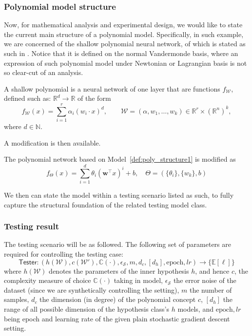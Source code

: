 \subsubsection{Polynomial model structure} 

Now, for mathematical analysis and experimental design, we would like to state the current main structure of a polynomial model. Specifically, in such example, we are concerned of the shallow polynomial neural network, of which is stated as such in \cite{arjevani2025geometryoptimizationshallowpolynomial}. Notice that it is defined on the normal Vandermonde basis, where an expression of such polynomial model under Newtonian or Lagrangian basis is not so clear-cut of an analysis.  

\begin{definition}\label{def:poly_structure1}
    A shallow polynomial is a neural network of one layer that are functions $f_{\mathcal W}$, defined such as:
$\mathbb R^d \rightarrow \mathbb{R}$ of the form
\begin{equation}\label{eq:network_model} f_{\mathcal W}(x) = \sum_{i=1}^r
\alpha_{i} (w_i \cdot x)^d, \qquad \mathcal W = (\alpha,w_1,\ldots,w_k) \in
\mathbb{R}^r \times (\mathbb{R}^{n})^k,
\end{equation} 
where $d \in \mathbb{N}$.
\end{definition}
A modification is then available. 
\begin{definition}
    The polynomial network based on Model~\ref{def:poly_structure1} is modified as 
    \begin{equation}
        f_{\Theta}(x) = \sum_{i=1}^{d} \theta_i \left( \mathbf{w}^\top x \right)^i + b, \quad \Theta = (\{\theta_{i}\},\{w_{k}\},b)
    \end{equation}
\end{definition}
We then can state the model within a testing scenario listed as such, to fully capture the structural foundation of the related testing model class. 

\subsubsection{Testing result}

The testing scenario will be as followed. The following set of parameters are required for controlling the testing case: 
\begin{equation}
    \mathsf{Tester}: (h(\mathcal{W}),c(\mathcal{W}'),\mathbb{C}(\cdot), \epsilon_{\mathcal{S}}, m, d_{c}, [d_{h}], \mathrm{epoch}, lr)\to \{\mathbb{E}[\ell]\}
\end{equation}
where $h(\mathcal{W})$ denotes the parameters of the inner hypothesis $h$, and hence $c$, the complexity measure of choice $\mathbb{C}(\cdot)$ taking in model, $\epsilon_{\mathcal{S}}$ the error noise of the dataset (since we are synthetically controlling the setting), $m$ the number of samples, $d_{c}$ the dimension (in degree) of the polynomial concept $c$, $[d_{h}]$ the range of all possible dimension of the hypothesis class's $h$ models, and $\mathrm{epoch}, lr$ being epoch and learning rate of the given plain stochastic gradient descent setting. 


